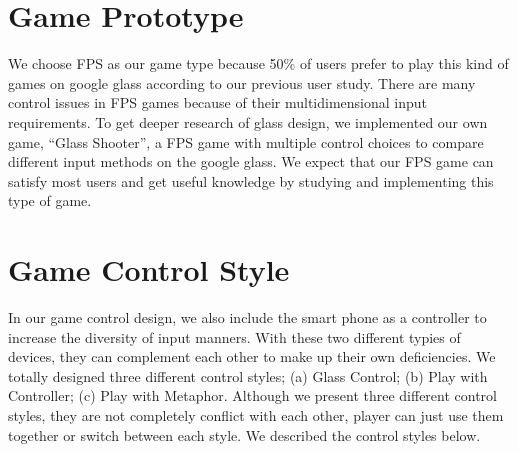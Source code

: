 \documentclass{sigchi}
\begin{document}


\section{Game Prototype}
We choose FPS as our game type because 50\% of users prefer to play this kind of games on google glass according to our previous user study. There are many control issues in FPS games because of their multidimensional input requirements. To get deeper research of glass design, we implemented our own game, ``Glass Shooter'', a FPS game with multiple control choices to compare different input methods on the google glass. We expect that our FPS game can satisfy most users and get useful knowledge by studying and implementing this type of game.

\section{Game Control Style}
In our game control design, we also include the smart phone as a controller to increase the diversity of input manners. With these two different typies of devices, they can complement each other to make up their own deficiencies. We totally designed three different control styles; (a) Glass Control; (b) Play with Controller; (c) Play with Metaphor. Although we present three different control styles, they are not completely conflict with each other, player can just use them together or switch between each style. We described the control styles below.
\end{document}
